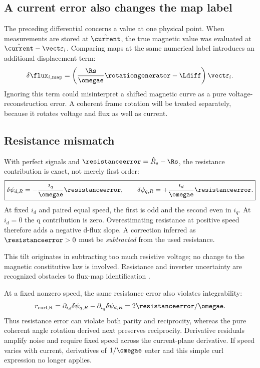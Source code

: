 \subsection{A current error also changes the map label}
The preceding differential concerns a value at one physical point.
When measurements are stored at $\hat\current$, the true magnetic value was
evaluated at $\hat\current-\vect\varepsilon_i$. Comparing maps at the same
numerical label introduces an additional displacement term:
\begin{equation}
 \delta\flux_{i,\rm map}=
 \left(\frac{\Rs}{\omegae}\rotationgenerator-\Ldiff\right)\vect\varepsilon_i.
 \label{eq:current-relabel}
\end{equation}
Ignoring this term could misinterpret a shifted magnetic curve as a pure
voltage-reconstruction error. A coherent frame rotation will be treated
separately, because it rotates voltage and flux as well as current.

\subsection{Resistance mismatch}
With perfect signals and $\resistanceerror=\hat R_s-\Rs$, the resistance contribution
is exact, not merely first order:
\begin{equation}
 \boxed{\delta\psi_{d,R}=-\frac{i_q}{\omegae}\resistanceerror,\qquad
        \delta\psi_{q,R}=+\frac{i_d}{\omegae}\resistanceerror.}\label{eq:R-error}
\end{equation}
At fixed $i_d$ and paired equal speed, the first is odd and the second even
in $i_q$. At $i_d=0$ the q contribution is zero. Overestimating resistance at
positive speed therefore adds a negative d-flux slope. A correction inferred
as $\resistanceerror>0$ must be \emph{subtracted} from the used resistance.

This tilt originates in subtracting too much resistive voltage; no change to
the magnetic constitutive law is involved. Resistance and inverter uncertainty
are recognized obstacles to flux-map identification \cite{liu2018}.

At a fixed nonzero speed, the same resistance error also violates integrability:
\begin{equation}
 r_{\rm curl,R}=\partial_{i_d}\delta\psi_{q,R}
               -\partial_{i_q}\delta\psi_{d,R}=2\resistanceerror/\omegae.
 \label{eq:resistance-curl}
\end{equation}
Thus resistance error can violate both parity and reciprocity, whereas the
pure coherent angle rotation derived next preserves reciprocity. Derivative
residuals amplify noise and require fixed speed across the current-plane
derivative. If speed varies with current, derivatives of $1/\omegae$ enter
and this simple curl expression no longer applies.
